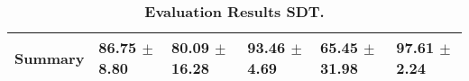 \begin{table}[htb]
{\begin{tabular}{llllll}
\midrule
\textbf{Summary                                  } &        \phantom{0}86.75 $\pm$ \phantom{0}8.80 &                      \phantom{0}80.09 $\pm$ 16.28 &        \phantom{0}93.46 $\pm$ \phantom{0}4.69 &            \phantom{0}65.45 $\pm$ 31.98 &  \phantom{0}97.61 $\pm$ \phantom{0}2.24 \\
\bottomrule
\end{tabular}%
}
\caption{\textbf{Evaluation Results SDT.}}
\label{tab:eval-results}
\end{table}


